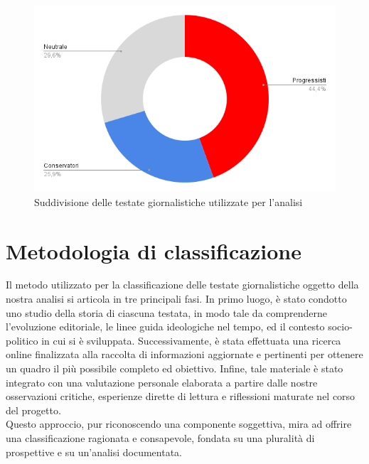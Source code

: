 \begin{figure}
    \centering
    \includegraphics[width=0.75\linewidth]{Immagini/Classificazione delle Testate.png}
    \caption{Suddivisione delle testate giornalistiche utilizzate per l'analisi}
    \label{fig:enter-label}
\end{figure}

\section{Metodologia di classificazione}
Il metodo utilizzato per la classificazione delle testate giornalistiche oggetto della nostra analisi si articola in tre principali fasi. In primo luogo, è stato condotto uno studio della storia di ciascuna testata, in modo tale da comprenderne l’evoluzione editoriale, le linee guida ideologiche nel tempo, ed il contesto socio-politico in cui si è sviluppata. Successivamente, è stata effettuata una ricerca online finalizzata alla raccolta di informazioni aggiornate e pertinenti per ottenere un quadro il più possibile completo ed obiettivo. Infine, tale materiale è stato integrato con una valutazione personale elaborata a partire dalle nostre osservazioni critiche, esperienze dirette di lettura e riflessioni maturate nel corso del progetto. \\ 
Questo approccio, pur riconoscendo una componente soggettiva, mira ad offrire una classificazione ragionata e consapevole, fondata su una pluralità di prospettive e su un'analisi documentata.
